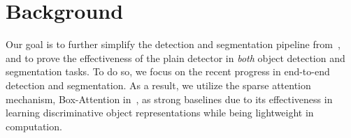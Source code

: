 \section{Background}
\label{sec:background}
Our goal is to further simplify the detection and segmentation pipeline from~\cite{zhu2021deformable,li2022vitdet,nguyen2022boxer}, and to prove the effectiveness of the plain detector in \textit{both} object detection and segmentation tasks. To do so, we focus on the recent progress in end-to-end detection and segmentation. As a result, we utilize the sparse attention mechanism, Box-Attention in~\cite{nguyen2022boxer}, as strong baselines due to its effectiveness in learning discriminative object representations while being lightweight in computation.


